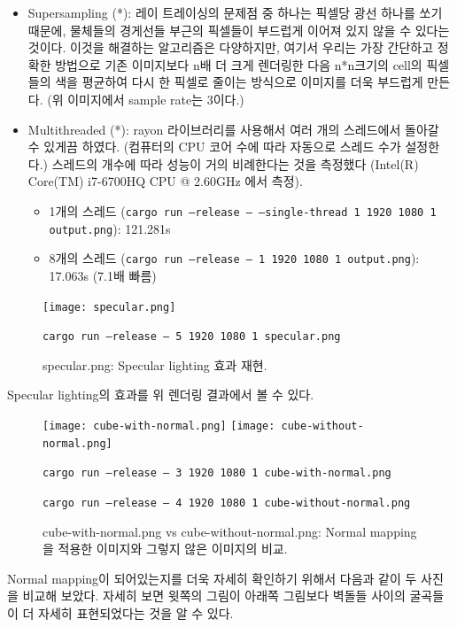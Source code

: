 \documentclass[11pt, a4paper]{article}
\begin{document}
\begin{itemize}
  \item Supersampling (*): 레이 트레이싱의 문제점 중 하나는 픽셀당 광선 하나를 쏘기 때문에, 물체들의 경게선들 부근의 픽셀들이 부드럽게 이어져 있지 않을 수 있다는 것이다. 이것을 해결하는 알고리즘은 다양하지만, 여기서 우리는 가장 간단하고 정확한 방법으로 기존 이미지보다 n배 더 크게 렌더링한 다음 n*n크기의 cell의 픽셀들의 색을 평균하여 다시 한 픽셀로 줄이는 방식으로 이미지를 더욱 부드럽게 만든다. (위 이미지에서 sample rate는 3이다.)
    
  \item Multithreaded (*): rayon 라이브러리를 사용해서 여러 개의 스레드에서 돌아갈 수 있게끔 하였다. (컴퓨터의 CPU 코어 수에 따라 자동으로 스레드 수가 설정한다.) 스레드의 개수에 따라 성능이 거의 비례한다는 것을 측정했다 (Intel(R) Core(TM) i7-6700HQ CPU @ 2.60GHz 에서 측정).
    \begin{itemize}
      \item 1개의 스레드 (\texttt{cargo run --release -- --single-thread 1 1920 1080 1 output.png}): 121.281s
      \item 8개의 스레드 (\texttt{cargo run --release -- 1 1920 1080 1 output.png}): 17.063s (7.1배 빠름)
    \end{itemize}

\end{itemize}


\begin{figure}[H]
  \centering
  \texttt{[image: specular.png]}
  \caption{specular.png: Specular lighting 효과 재현.}
  \texttt{cargo run --release -- 5 1920 1080 1 specular.png}
\end{figure}

Specular lighting의 효과를 위 렌더링 결과에서 볼 수 있다.

\begin{figure}[H]
  \centering
  \texttt{[image: cube-with-normal.png]}
  \texttt{[image: cube-without-normal.png]}
  \caption{cube-with-normal.png vs cube-without-normal.png: Normal mapping을 적용한 이미지와 그렇지 않은 이미지의 비교.}

  \texttt{cargo run --release -- 3 1920 1080 1 cube-with-normal.png}

  \texttt{cargo run --release -- 4 1920 1080 1 cube-without-normal.png}
\end{figure}


Normal mapping이 되어있는지를 더욱 자세히 확인하기 위해서 다음과 같이 두 사진을 비교해 보았다. 자세히 보면 윗쪽의 그림이 아래쪽 그림보다 벽돌들 사이의 굴곡들이 더 자세히 표현되었다는 것을 알 수 있다.
\end{document}
